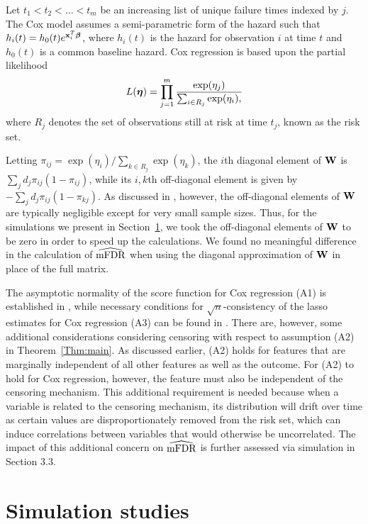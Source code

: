 Let $t_1 < t_2 < \ldots < t_m$ be an increasing list of unique failure times indexed by $j$. The Cox model assumes a semi-parametric form of the hazard such that $h_i(t) = h_0(t)e^{\mathbf{x}_i^T \boldsymbol{\beta}}$, where $h_i(t)$ is the hazard for observation $i$ at time $t$ and $h_0(t)$ is a common baseline hazard. Cox regression is based upon the partial likelihood \citep{Cox1972}
\begin{equation*}
L(\boldsymbol{\eta})  = \prod_{j=1}^{m} \frac{\exp(\eta_j)}{\sum_{i \in R_j} \exp(\eta_i),} 
\end{equation*}
where $R_j$ denotes the set of observations still at risk at time $t_j$, known as the risk set.

Letting $\pi_{ij} = \exp(\eta_i)/\sum_{k \in R_j}\exp(\eta_k)$, the $i$th diagonal element of $\mathbf{W}$ is $\sum_j d_j\pi_{ij}(1-\pi_{ij})$, while its $i,k$th off-diagonal element is given by $-\sum_j d_j\pi_{ij}(1-\pi_{kj})$.  As discussed in \citet{Simon2011}, however, the off-diagonal elements of $\mathbf{W}$ are typically negligible except for very small sample sizes.  Thus, for the simulations we present in Section~\ref{Sec:sim}, we took the off-diagonal elements of $\mathbf{W}$ to be zero in order to speed up the calculations.  We found no meaningful difference in the calculation of $\widehat{\textrm{mFDR}}$ when using the diagonal approximation of $\mathbf{W}$ in place of the full matrix.

The asymptotic normality of the score function for Cox regression (A1) is established in \citet{Andersen1982}, while necessary conditions for $\sqrt{n}$-consistency of the lasso estimates for Cox regression (A3) can be found in \citet{Fan_scad}.  There are, however, some additional considerations considering censoring with respect to assumption (A2) in Theorem~\ref{Thm:main}.  As discussed earlier, (A2) holds for features that are marginally independent of all other features as well as the outcome.  For (A2) to hold for Cox regression, however, the feature must also be independent of the censoring mechanism.  This additional requirement is needed because when a variable is related to the censoring mechanism, its distribution will drift over time as certain values are disproportionately removed from the risk set, which can induce correlations between variables that would otherwise be uncorrelated. The impact of this additional concern on $\widehat{\textrm{mFDR}}$ is further assessed via simulation in Section 3.3. 

\section{Simulation studies}
\label{Sec:sim}

